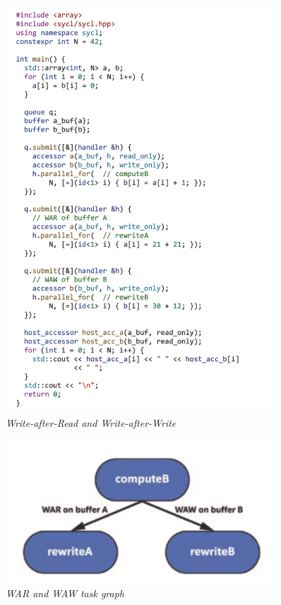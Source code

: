 \begin{figure}[H]
	\centering
	\includegraphics[width=0.9\textwidth]{figs/F3.15.png}
	\caption{\textit{Write-after-Read and Write-after-Write}}
\end{figure}

\begin{figure}[H]
	\centering
	\includegraphics[width=0.9\textwidth]{figs/F3.16.png}
	\caption{\textit{WAR and WAW task graph}}
\end{figure}

